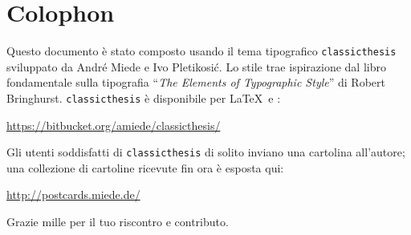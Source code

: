 \pagestyle{empty}

\hfill

\vfill


\section*{Colophon}
Questo documento è stato composto usando il tema tipografico \texttt{classicthesis} sviluppato da Andr\'e Miede e Ivo Pletikosić.
Lo stile trae ispirazione dal libro fondamentale sulla tipografia ``\emph{The Elements of Typographic Style}'' di Robert Bringhurst.
\texttt{classicthesis} è disponibile per \LaTeX\ e \mLyX:
\begin{center}
\url{https://bitbucket.org/amiede/classicthesis/}
\end{center}
Gli utenti soddisfatti di \texttt{classicthesis} di solito inviano una cartolina all'autore; 
una collezione di cartoline ricevute fin ora è esposta qui: 
\begin{center}
\url{http://postcards.miede.de/}
\end{center}
Grazie mille per il tuo riscontro e contributo. 

\bigskip

\noindent\finalVersionString


%
%
